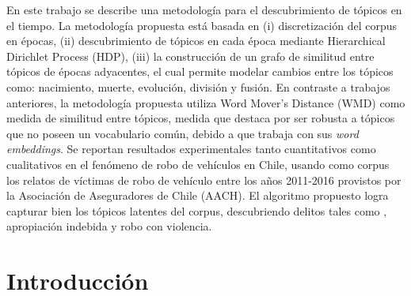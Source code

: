 \documentclass[letterpaper,12pt,oneside]{book} %
\begin{document}



\begin{dedicatoria}
\end{dedicatoria}

\begin{agradecimientos}
\end{agradecimientos}



\begin{resumen}
    En este trabajo se describe una metodología para el descubrimiento de tópicos en el tiempo. La metodología propuesta está basada en (i) discretización del corpus en épocas, (ii) descubrimiento de tópicos en cada época mediante Hierarchical Dirichlet Process (HDP), (iii) la construcción de un grafo de similitud entre tópicos de épocas adyacentes, el cual permite modelar cambios entre los tópicos como: nacimiento, muerte, evolución, división y fusión. En contraste a trabajos anteriores, la metodología propuesta utiliza Word Mover's Distance (WMD) como medida de similitud entre tópicos, medida que destaca por ser robusta a tópicos que no poseen un vocabulario común, debido a que trabaja con sus \textit{word embeddings}. Se reportan resultados experimentales tanto cuantitativos como cualitativos en el fenómeno de robo de vehículos en Chile, usando como corpus los relatos de víctimas de robo de vehículo entre los años 2011-2016 provistos por la Asociación de Aseguradores de Chile (AACH). El algoritmo propuesto logra capturar bien los tópicos latentes del corpus, descubriendo delitos tales como , apropiación indebida y robo con violencia.
\end{resumen}


\hypersetup{
    citecolor=Blue
}

\listoftodos
\chapter{Introducción}
\label{ch:introduction}

\end{document}
